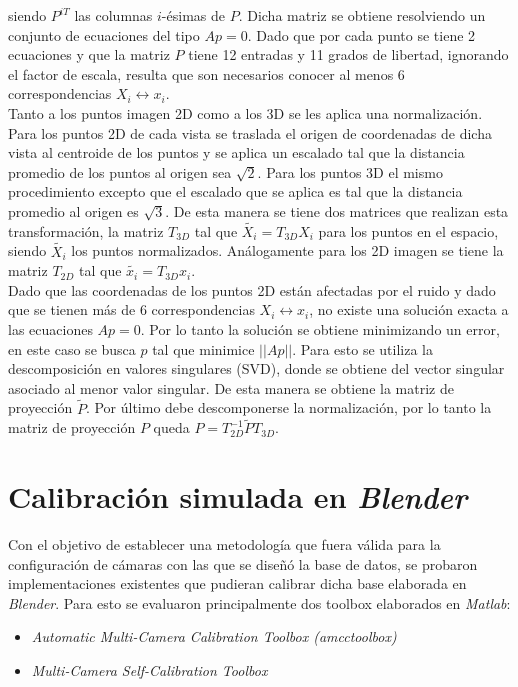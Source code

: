  siendo $P^{iT}$ las columnas $i$-ésimas de $P$. Dicha matriz se obtiene resolviendo un conjunto de ecuaciones del tipo $Ap=0$.  Dado que por cada punto se tiene 2 ecuaciones y que la matriz $P$ tiene 12 entradas y 11 grados de libertad, ignorando el factor de escala, resulta que son necesarios conocer al menos 6 correspondencias $X_i \leftrightarrow x_i$.\\
 
 Tanto a los puntos imagen 2D como a los 3D se les aplica una normalización. Para los puntos 2D de cada vista se traslada el origen de coordenadas de dicha vista al centroide de los puntos y se aplica un escalado tal que la distancia promedio de los puntos al origen sea $\sqrt{2}$. Para los puntos 3D el mismo procedimiento excepto que el escalado que se aplica es tal que la distancia promedio al origen es $\sqrt{3}$. De esta manera se tiene dos matrices que realizan esta transformación, la matriz $T_{3D}$ tal que $\tilde{X_i} = T_{3D}^{}X_i$ para los puntos en el espacio, siendo $\tilde{X_i}$ los puntos normalizados. Análogamente para los 2D imagen se tiene la matriz $T_{2D}^{}$ tal que $\tilde{x_i} = T_{3D}^{}x_i$. \\
 
 Dado que las coordenadas de los puntos 2D están afectadas por el ruido y dado que se tienen más de 6 correspondencias $X_i \leftrightarrow x_i$, no existe una solución exacta a las ecuaciones $Ap=0$. Por lo tanto la solución se obtiene minimizando un error, en este caso se busca $p$ tal que minimice $||Ap||$. Para esto se utiliza la descomposición en valores singulares (SVD), donde se obtiene del vector singular asociado al menor valor singular. De esta manera se obtiene la matriz de proyección $\tilde{P}$. Por último debe descomponerse la normalización, por lo tanto la matriz de proyección $P$ queda $P = T_{2D}^{-1} \tilde{P} T_{3D}^{}$.
 
\section{Calibración simulada en \emph{Blender}}
 
 Con el objetivo de establecer una metodología que fuera válida para la configuración de cámaras con las que se diseñó la base de datos, se probaron implementaciones existentes que pudieran calibrar dicha base elaborada en \emph{Blender}. Para esto se evaluaron principalmente dos toolbox elaborados en \emph{Matlab}:
 
 \begin{itemize}
 \item  \emph{Automatic Multi-Camera Calibration Toolbox (amcctoolbox)}
 \item  \emph{Multi-Camera Self-Calibration Toolbox}
 \end{itemize} 
 

